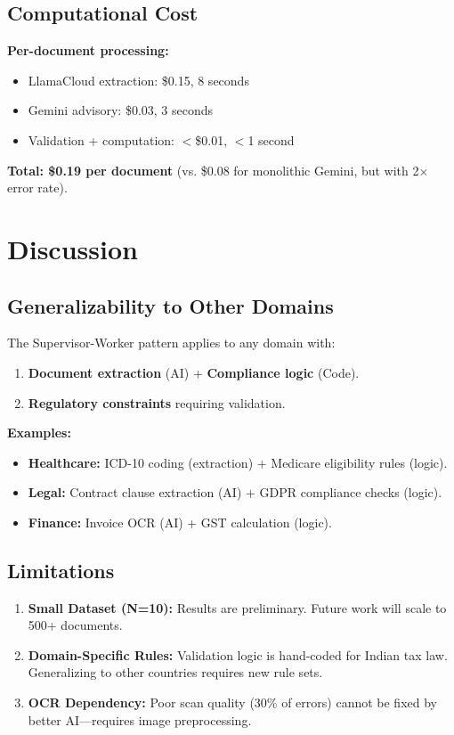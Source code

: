 \documentclass[conference]{IEEEtran}
\begin{document}
\subsection{Computational Cost}

\textbf{Per-document processing:}
\begin{itemize}
    \item LlamaCloud extraction: \$0.15, 8 seconds
    \item Gemini advisory: \$0.03, 3 seconds
    \item Validation + computation: $<$\$0.01, $<$1 second
\end{itemize}

\textbf{Total: \$0.19 per document} (vs. \$0.08 for monolithic Gemini, but with 2$\times$ error rate).

\section{Discussion}
\label{sec:discussion}

\subsection{Generalizability to Other Domains}

The Supervisor-Worker pattern applies to any domain with:
\begin{enumerate}
    \item \textbf{Document extraction} (AI) + \textbf{Compliance logic} (Code).
    \item \textbf{Regulatory constraints} requiring validation.
\end{enumerate}

\textbf{Examples:}
\begin{itemize}
    \item \textbf{Healthcare:} ICD-10 coding (extraction) + Medicare eligibility rules (logic).
    \item \textbf{Legal:} Contract clause extraction (AI) + GDPR compliance checks (logic).
    \item \textbf{Finance:} Invoice OCR (AI) + GST calculation (logic).
\end{itemize}

\subsection{Limitations}

\begin{enumerate}
    \item \textbf{Small Dataset (N=10):} Results are preliminary. Future work will scale to 500+ documents.
    \item \textbf{Domain-Specific Rules:} Validation logic is hand-coded for Indian tax law. Generalizing to other countries requires new rule sets.
    \item \textbf{OCR Dependency:} Poor scan quality (30\% of errors) cannot be fixed by better AI---requires image preprocessing.
\end{enumerate}
\end{document}
